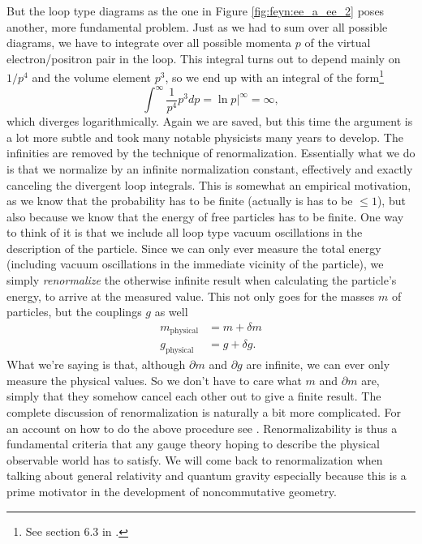 But the loop type diagrams as the one in Figure \ref{fig:feyn:ee_a_ee_2} poses another, more fundamental problem. Just as we had to sum over all possible diagrams, we have to integrate over all possible momenta $p$ of the virtual electron/positron pair in the loop. This integral turns out to depend mainly on $1 / p^4$ and the volume element $p^3$, so we end up with an integral of the form\footnote{See section 6.3 in \cite{griffiths1987iep}.}
\begin{equation}
	\int^\infty \frac{1}{p^4}p^3 dp = \ln{p}|^\infty = \infty,
\end{equation}
which diverges logarithmically. Again we are saved, but this time the argument is a lot more subtle and took many notable physicists many years to develop. The infinities are removed by the technique of renormalization. Essentially what we do is that we normalize by an infinite normalization constant, effectively and exactly canceling the divergent loop integrals. This is somewhat an empirical motivation, as we know that the probability has to be finite (actually is has to be $\leq 1$), but also because we know that the energy of free particles has to be finite. One way to think of it is that we include all loop type vacuum oscillations in the description of the particle. Since we can only ever measure the total energy (including vacuum oscillations in the immediate vicinity of the particle), we simply \emph{renormalize} the otherwise infinite result when calculating the particle's energy, to arrive at the measured value. This not only goes for the masses $m$ of particles, but the couplings $g$ as well \cite{griffiths1987iep}
\begin{align}
	m_{\textrm{physical}} &= m + \delta m \nonumber \\
	g_{\textrm{physical}} &= g + \delta g.
\end{align}
What we're saying is that, although $\partial m$ and $\partial g$ are infinite, we can ever only measure the physical values. So we don't have to care what $m$ and $\partial m$ are, simply that they somehow cancel each other out to give a finite result. The complete discussion of renormalization is naturally a bit more complicated. For an account on how to do the above procedure see \cite{sakurai1967aqm}. Renormalizability is thus a fundamental criteria that any gauge theory hoping to describe the physical observable world has to satisfy. We will come back to renormalization when talking about general relativity and quantum gravity especially because this is a prime motivator in the development of noncommutative geometry.
